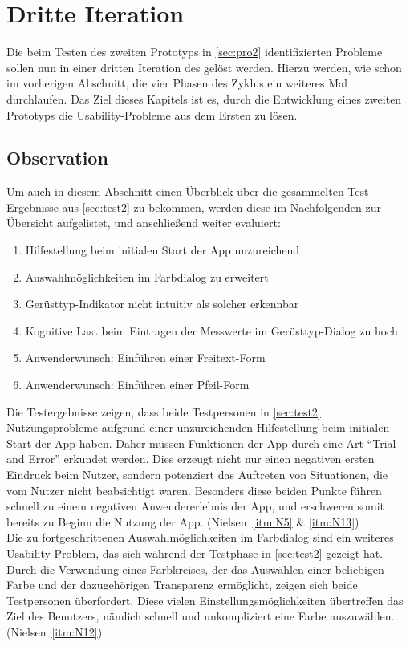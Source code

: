 \chapter{Dritte Iteration}\label{chap:pro3}
Die beim Testen des zweiten Prototyps in \autoref{sec:pro2} identifizierten Probleme sollen nun in einer dritten Iteration des \hcdp{} gelöst werden.
Hierzu werden, wie schon im vorherigen Abschnitt, die vier Phasen des Zyklus ein weiteres Mal durchlaufen.
Das Ziel dieses Kapitels ist es, durch die Entwicklung eines zweiten Prototyps die Usability-Probleme aus dem Ersten zu lösen.

\section{Observation}\label{sec:obs3}
Um auch in diesem Abschnitt einen Überblick über die gesammelten Test-Ergebnisse aus \autoref{sec:test2} zu bekommen, werden diese im Nachfolgenden zur Übersicht aufgelistet, und anschließend weiter evaluiert:

\begin{enumerate}
  \item Hilfestellung beim initialen Start der App unzureichend
  \item Auswahlmöglichkeiten im Farbdialog zu erweitert
  \item Gerüsttyp-Indikator nicht intuitiv als solcher erkennbar
  \item Kognitive Last beim Eintragen der Messwerte im Gerüsttyp-Dialog zu hoch
  \item Anwenderwunsch: Einführen einer Freitext-Form
  \item Anwenderwunsch: Einführen einer Pfeil-Form 
\end{enumerate}

\noindent
Die Testergebnisse zeigen, dass beide Testpersonen in \autoref{sec:test2} Nutzungsprobleme aufgrund einer unzureichenden Hilfestellung beim initialen Start der App haben.
Daher müssen Funktionen der App durch eine Art ``Trial and Error'' erkundet werden.
Dies erzeugt nicht nur einen negativen ersten Eindruck beim Nutzer, sondern potenziert das Auftreten von Situationen, die vom Nutzer nicht beabsichtigt waren.
Besonders diese beiden Punkte führen schnell zu einem negativen Anwendererlebnis der App, und erschweren somit bereits zu Beginn die Nutzung der App.
(Nielsen~\autoref{itm:N5} \& \autoref{itm:N13}) \\

Die zu fortgeschrittenen Auswahlmöglichkeiten im Farbdialog sind ein weiteres Usability-Problem, das sich während der Testphase in \autoref{sec:test2} gezeigt hat.
Durch die Verwendung eines Farbkreises, der das Auswählen einer beliebigen Farbe und der dazugehörigen Transparenz ermöglicht, zeigen sich beide Testpersonen überfordert.
Diese vielen Einstellungsmöglichkeiten übertreffen das Ziel des Benutzers, nämlich schnell und unkompliziert eine Farbe auszuwählen.
(Nielsen~\autoref{itm:N12}) \\

